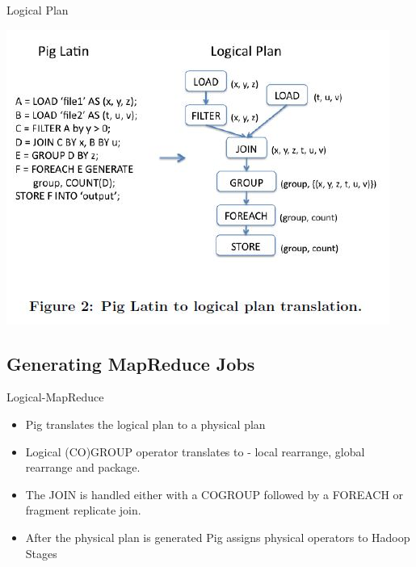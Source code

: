 \begin{frame}{Logical Plan}
\centerline{\includegraphics[scale=0.55]{Images/PigLatin.JPG}}
\let\thefootnote\relax{}
\end{frame}

\subsection{Generating MapReduce Jobs}
\begin{frame}{Logical-MapReduce}
\begin{itemize}
	\item Pig translates the logical plan to a physical plan
	\item Logical (CO)GROUP operator translates to - local rearrange, global
          rearrange and package.
	\item The JOIN is handled either with a COGROUP followed by a FOREACH or
          fragment replicate join.
	\item After the physical plan is generated Pig assigns physical operators to
          Hadoop Stages
\end{itemize}
\end{frame}

